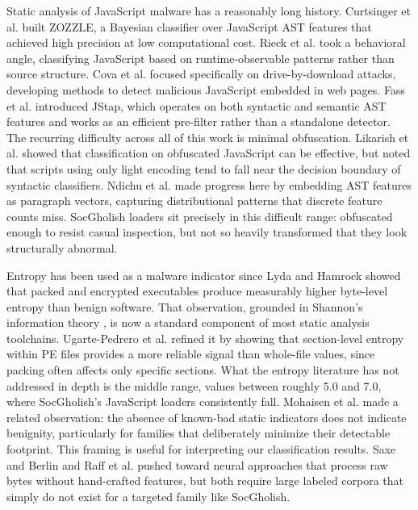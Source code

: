 \documentclass[pdflatex,sn-mathphys-num]{sn-jnl}
\theoremstyle{thmstyleone}%
\theoremstyle{thmstyletwo}%
\theoremstyle{thmstylethree}%
\begin{document}
Static analysis of JavaScript malware has a reasonably long history. Curtsinger et al. \cite{curtsinger2011} built ZOZZLE, a Bayesian classifier over JavaScript AST features that achieved high precision at low computational cost. Rieck et al. \cite{rieck2010} took a behavioral angle, classifying JavaScript based on runtime-observable patterns rather than source structure. Cova et al. \cite{cova2010} focused specifically on drive-by-download attacks, developing methods to detect malicious JavaScript embedded in web pages. Fass et al. \cite{fass2018} introduced JStap, which operates on both syntactic and semantic AST features and works as an efficient pre-filter rather than a standalone detector. The recurring difficulty across all of this work is minimal obfuscation. Likarish et al. \cite{likarish2009} showed that classification on obfuscated JavaScript can be effective, but noted that scripts using only light encoding tend to fall near the decision boundary of syntactic classifiers. Ndichu et al. \cite{ndichu2019} made progress here by embedding AST features as paragraph vectors, capturing distributional patterns that discrete feature counts miss. SocGholish loaders sit precisely in this difficult range: obfuscated enough to resist casual inspection, but not so heavily transformed that they look structurally abnormal.

Entropy has been used as a malware indicator since Lyda and Hamrock \cite{lyda2007} showed that packed and encrypted executables produce measurably higher byte-level entropy than benign software. That observation, grounded in Shannon's information theory \cite{shannon1949}, is now a standard component of most static analysis toolchains. Ugarte-Pedrero et al. \cite{ugarte2015} refined it by showing that section-level entropy within PE files provides a more reliable signal than whole-file values, since packing often affects only specific sections. What the entropy literature has not addressed in depth is the middle range, values between roughly 5.0 and 7.0, where SocGholish's JavaScript loaders consistently fall. Mohaisen et al. \cite{mohaisen2015} made a related observation: the absence of known-bad static indicators does not indicate benignity, particularly for families that deliberately minimize their detectable footprint. This framing is useful for interpreting our classification results. Saxe and Berlin \cite{saxe2015} and Raff et al. \cite{raff2018} pushed toward neural approaches that process raw bytes without hand-crafted features, but both require large labeled corpora that simply do not exist for a targeted family like SocGholish.
\end{document}
